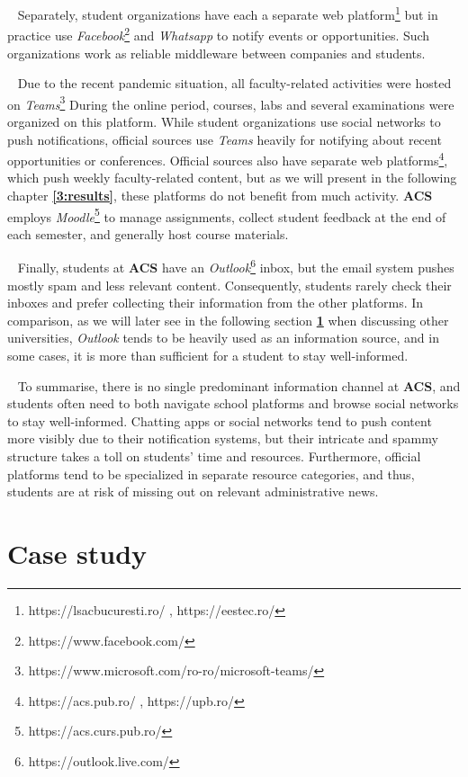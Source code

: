 ~
Separately, student organizations have each a separate web platform\footnote{https://lsacbucuresti.ro/ , https://eestec.ro/ } but in practice use \textit{Facebook}\footnote{https://www.facebook.com/} and \textit{Whatsapp} to notify events or opportunities. Such organizations work as reliable middleware between companies and students.

~
Due to the recent pandemic situation, all faculty-related activities were hosted on \textit{Teams}\footnote{https://www.microsoft.com/ro-ro/microsoft-teams/} During the online period, courses, labs and several examinations were organized on this platform. While student organizations use social networks to push notifications, official sources use \textit{Teams} heavily for notifying about recent opportunities or conferences. Official sources also have separate web platforms\footnote{https://acs.pub.ro/ ,  https://upb.ro/}, which push weekly faculty-related content, but as we will present in the following chapter \textbf{\ref{3:results}}, these platforms do not benefit from much activity. \textbf{ACS} employs \textit{Moodle}\footnote{https://acs.curs.pub.ro/} to manage assignments, collect student feedback at the end of each semester, and generally host course materials. 

~
Finally, students at \textbf{ACS} have an \textit{Outlook}\footnote{https://outlook.live.com/} inbox, but the email system pushes mostly spam and less relevant content. Consequently, students rarely check their inboxes and prefer collecting their information from the other platforms. In comparison, as we will later see in the following section \textbf{\ref{2:case_study}} when discussing other universities, \textit{Outlook} tends to be heavily used as an information source, and in some cases, it is more than sufficient for a student to stay well-informed.

~
To summarise, there is no single predominant information channel at \textbf{ACS}, and students often need to both navigate school platforms and browse social networks to stay well-informed. Chatting apps or social networks tend to push content more visibly due to their notification systems, but their intricate and spammy structure takes a toll on students' time and resources. Furthermore, official platforms tend to be specialized in separate resource categories, and thus, students are at risk of missing out on relevant administrative news.


\section{Case study} \label{2:case_study}

